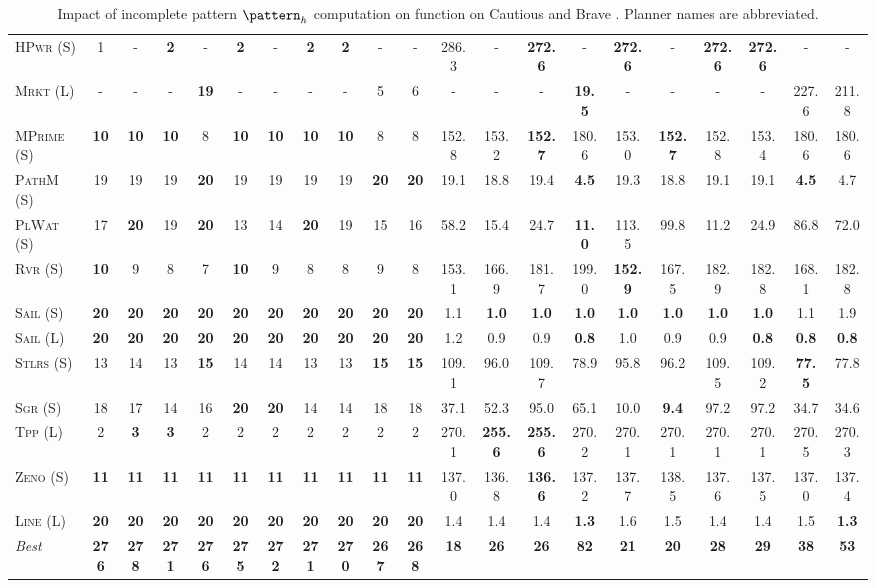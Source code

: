 \documentclass[11pt,landscape]{article}
\begin{document}
\begin{table}[tb]
{\begin{tabular}{|l||cccccccccc||cccccccccc||}
\textsc{HPwr} (S)&1&-&\textbf{2}&-&\textbf{2}&-&\textbf{2}&\textbf{2}&-&-&286.3&-&\textbf{272.6}&-&\textbf{272.6}&-&\textbf{272.6}&\textbf{272.6}&-&-\\
\textsc{Mrkt} (L)&-&-&-&\textbf{19}&-&-&-&-&5&6&-&-&-&\textbf{19.5}&-&-&-&-&227.6&211.8\\
\textsc{MPrime} (S)&\textbf{10}&\textbf{10}&\textbf{10}&8&\textbf{10}&\textbf{10}&\textbf{10}&\textbf{10}&8&8&152.8&153.2&\textbf{152.7}&180.6&153.0&\textbf{152.7}&152.8&153.4&180.6&180.6\\
\textsc{PathM} (S)&19&19&19&\textbf{20}&19&19&19&19&\textbf{20}&\textbf{20}&19.1&18.8&19.4&\textbf{4.5}&19.3&18.8&19.1&19.1&\textbf{4.5}&4.7\\
\textsc{PlWat} (S)&17&\textbf{20}&19&\textbf{20}&13&14&\textbf{20}&19&15&16&58.2&15.4&24.7&\textbf{11.0}&113.5&99.8&11.2&24.9&86.8&72.0\\
\textsc{Rvr} (S)&\textbf{10}&9&8&7&\textbf{10}&9&8&8&9&8&153.1&166.9&181.7&199.0&\textbf{152.9}&167.5&182.9&182.8&168.1&182.8\\
\textsc{Sail} (S)&\textbf{20}&\textbf{20}&\textbf{20}&\textbf{20}&\textbf{20}&\textbf{20}&\textbf{20}&\textbf{20}&\textbf{20}&\textbf{20}&1.1&\textbf{1.0}&\textbf{1.0}&\textbf{1.0}&\textbf{1.0}&\textbf{1.0}&\textbf{1.0}&\textbf{1.0}&1.1&1.9\\
\textsc{Sail} (L)&\textbf{20}&\textbf{20}&\textbf{20}&\textbf{20}&\textbf{20}&\textbf{20}&\textbf{20}&\textbf{20}&\textbf{20}&\textbf{20}&1.2&0.9&0.9&\textbf{0.8}&1.0&0.9&0.9&\textbf{0.8}&\textbf{0.8}&\textbf{0.8}\\
\textsc{Stlrs} (S)&13&14&13&\textbf{15}&14&14&13&13&\textbf{15}&\textbf{15}&109.1&96.0&109.7&78.9&95.8&96.2&109.5&109.2&\textbf{77.5}&77.8\\
\textsc{Sgr} (S)&18&17&14&16&\textbf{20}&\textbf{20}&14&14&18&18&37.1&52.3&95.0&65.1&10.0&\textbf{9.4}&97.2&97.2&34.7&34.6\\
\textsc{Tpp} (L)&2&\textbf{3}&\textbf{3}&2&2&2&2&2&2&2&270.1&\textbf{255.6}&\textbf{255.6}&270.2&270.1&270.1&270.1&270.1&270.5&270.3\\
\textsc{Zeno} (S)&\textbf{11}&\textbf{11}&\textbf{11}&\textbf{11}&\textbf{11}&\textbf{11}&\textbf{11}&\textbf{11}&\textbf{11}&\textbf{11}&137.0&136.8&\textbf{136.6}&137.2&137.7&138.5&137.6&137.5&137.0&137.4\\
\textsc{Line} (L)&\textbf{20}&\textbf{20}&\textbf{20}&\textbf{20}&\textbf{20}&\textbf{20}&\textbf{20}&\textbf{20}&\textbf{20}&\textbf{20}&1.4&1.4&1.4&\textbf{1.3}&1.6&1.5&1.4&1.4&1.5&\textbf{1.3}
\\\hline
\textit{Best}&\textbf{276}&\textbf{278}&\textbf{271}&\textbf{276}&\textbf{275}&\textbf{272}&\textbf{271}&\textbf{270}&\textbf{267}&\textbf{268}&\textbf{18}&\textbf{26}&\textbf{26}&\textbf{82}&\textbf{21}&\textbf{20}&\textbf{28}&\textbf{29}&\textbf{38}&\textbf{53}\\\hline

        \end{tabular}}
        \caption{Impact of incomplete pattern $\pattern_h$ computation on function on Cautious and Brave \pattyd. Planner names are abbreviated.}
        \label{tab:abl-patternh-incomplete}
        \end{table}
        
\end{document}
